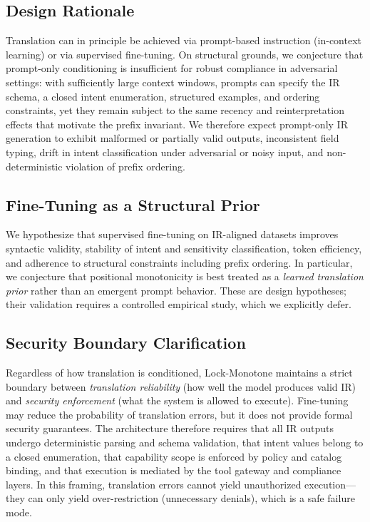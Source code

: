 \documentclass[conference]{IEEEtran}
\begin{document}
\subsection{Design Rationale}
Translation can in principle be achieved via prompt-based instruction
(in-context learning) or via supervised fine-tuning. On structural
grounds, we conjecture that prompt-only conditioning is insufficient for
robust compliance in adversarial settings: with sufficiently large context
windows, prompts can specify the IR schema, a closed intent enumeration,
structured examples, and ordering constraints, yet they remain subject to
the same recency and reinterpretation effects that motivate the prefix
invariant. We therefore expect prompt-only IR generation to exhibit
malformed or partially valid outputs, inconsistent field typing, drift in
intent classification under adversarial or noisy input, and
non-deterministic violation of prefix ordering.

\subsection{Fine-Tuning as a Structural Prior}
We hypothesize that supervised fine-tuning on IR-aligned datasets improves
syntactic validity, stability of intent and sensitivity classification,
token efficiency, and adherence to structural constraints including prefix
ordering. In particular, we conjecture that positional monotonicity is
best treated as a \emph{learned translation prior} rather than an emergent
prompt behavior. These are design hypotheses; their validation requires a
controlled empirical study, which we explicitly defer.

\subsection{Security Boundary Clarification}
Regardless of how translation is conditioned, Lock-Monotone maintains a
strict boundary between \emph{translation reliability} (how well the model
produces valid IR) and \emph{security enforcement} (what the system is
allowed to execute). Fine-tuning may reduce the probability of translation
errors, but it does not provide formal security guarantees. The
architecture therefore requires that all IR outputs undergo deterministic
parsing and schema validation, that intent values belong to a closed
enumeration, that capability scope is enforced by policy and catalog
binding, and that execution is mediated by the tool gateway and compliance
layers. In this framing, translation errors cannot yield unauthorized
execution---they can only yield over-restriction (unnecessary denials),
which is a safe failure mode.
\end{document}
